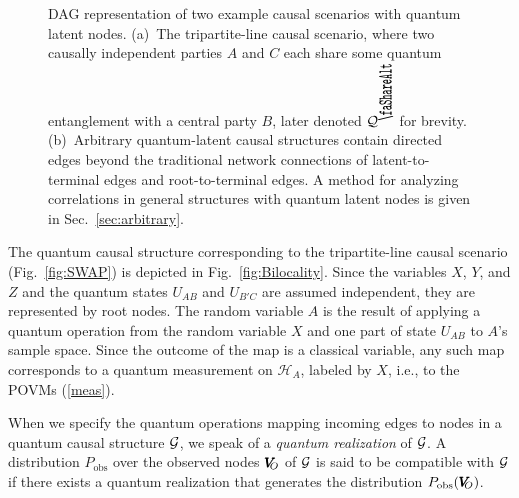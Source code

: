 \documentclass[superscriptaddress,aps,prx,nofootinbib,twocolumn,twoside,reprint,letterpaper,longbibliography]{revtex4-2}
\newcommand{\biloc}{\text{\scalebox{2}[1]{\rotatebox{90}{\faShareAlt}}}}
\def\H{{\mathcal H}}
\begin{document}
\begin{figure}[b]
  \begin{center}
    \hfill
  \end{center}
  \caption[]{
  DAG representation of two example causal scenarios with quantum latent nodes.
  (a)~The tripartite-line causal scenario, where two causally independent parties $A$ and $C$ each share some quantum entanglement with a central party $B$, later denoted $\mathcal{Q}^{{\protect\biloc}}$ for brevity.
  (b)~Arbitrary quantum-latent causal structures contain directed edges beyond the traditional network connections of latent-to-terminal edges and root-to-terminal edges. A method for analyzing correlations in general structures with quantum latent nodes is given in Sec.~\ref{sec:arbitrary}.
  \label{fig:qdags}
  }
\end{figure}

The quantum causal structure corresponding to the tripartite-line causal scenario (Fig.~\ref{fig:SWAP}) is depicted in Fig.~\ref{fig:Bilocality}. Since the variables $X$, $Y$, and $Z$ and the quantum states $U_{AB}$ and $U_{B'C}$ are assumed independent, they are represented by root nodes. The random variable $A$ is the result of applying a quantum operation from the random variable $X$ and one part of state $U_{AB}$ to $A$'s sample space. Since the outcome of the map is a classical variable, any such map corresponds to a quantum measurement on $\H_A$, labeled by $X$, i.e., to the POVMs (\ref{meas}).

When we specify the quantum operations mapping incoming edges to nodes in a quantum causal structure ${\cal G}$, we speak of a \emph{quantum realization} of ${\cal G}$. A distribution ${P_\text{obs}}$ over the observed nodes ${\pmb{V}\hspace{-1ex}}_{O}$ of ${\cal G}$ is said to be compatible with ${\cal G}$ if there exists a quantum realization that generates the distribution ${P_\text{obs}}({\pmb{V}\hspace{-1ex}}_{O})$.
\end{document}
